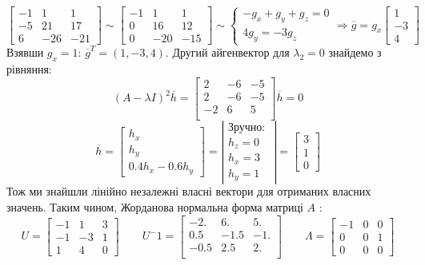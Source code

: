 \documentclass[14pt,a4paper]{scrartcl}
\theoremstyle{definition}
\theoremstyle{remark}
\theoremstyle{definition}
\theoremstyle{definition}
\begin{document}
$$
\begin{bmatrix}
-1 & 1 & 1 \\
-5 & 21 & 17 \\
6 & -26 & -21
\end{bmatrix} \sim
\begin{bmatrix}
-1 & 1 & 1 \\
0 & 16 & 12 \\
0 & -20 & -15
\end{bmatrix}
\sim
\left\lbrace
\begin{gathered}
  -g_x + g_y + g_z = 0\\
	4g_y  = -3 g_z
\end{gathered} \right. \Rightarrow \overline{g} = g_x \begin{bmatrix}
  1 \\ -3 \\ 4
\end{bmatrix}
$$
Взявши $g_x = 1$: $\overline{g}^T = (1, -3, 4)$.
Другий айгенвектор для $ \lambda_2 = 0$ знайдемо з рівняння:
$$
(A- \lambda I)^2 \overline{h} = \begin{bmatrix}
  2 & -6 & -5\\
  2 & -6 & -5\\
  -2 & 6 & 5\\
\end{bmatrix}  \overline{h} = 0
$$
$$
\overline{h} = \begin{bmatrix}
  h_x \\ h_y \\ 0.4 h_x - 0.6 h_y
\end{bmatrix} = \left| \begin{gathered}
 \text{Зручно: }\\ h_z =0\\
 h_x = 3\\
 h_y = 1
\end{gathered} \right|  = \begin{bmatrix}
 3 \\ 1 \\ 0
\end{bmatrix}
$$
Тож ми знайшли лінійно незалежні власні вектори для отриманих власних значень. Таким чином, Жорданова нормальна форма матриці $A$ :
$$
U = \begin{bmatrix}
-1 & 1 & 3 \\
-1 & -3 & 1 \\
1 & 4 & 0
\end{bmatrix} \qquad U^-1 = \begin{bmatrix}
  -2. & 6. & 5.\\
  0.5 & -1.5 & -1.\\
  -0.5 & 2.5 & 2.\\
\end{bmatrix}\qquad
\Lambda = \begin{bmatrix}
  -1 & 0 & 0 \\
	0 & 0 & 1 \\
 0 & 0 & 0
\end{bmatrix}
$$
\end{document}

